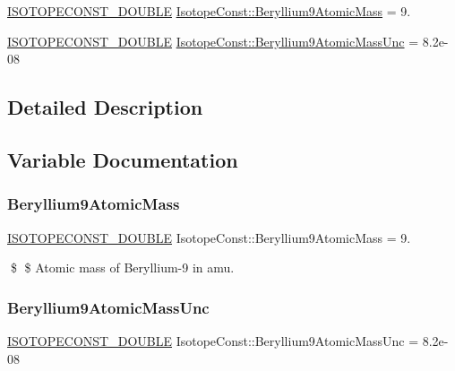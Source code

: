 \begin{DoxyCompactItemize}
\item 
\mbox{\hyperlink{group___isotope_const-_macros_ga8f45a7272ce02c0b4c65c44636ed719a}{I\+S\+O\+T\+O\+P\+E\+C\+O\+N\+S\+T\+\_\+\+D\+O\+U\+B\+LE}} \mbox{\hyperlink{group___isotope_const-_beryllium-_be9_ga7c66a28d4bb240f295546b7600386035}{Isotope\+Const\+::\+Beryllium9\+Atomic\+Mass}} = 9.
\item 
\mbox{\hyperlink{group___isotope_const-_macros_ga8f45a7272ce02c0b4c65c44636ed719a}{I\+S\+O\+T\+O\+P\+E\+C\+O\+N\+S\+T\+\_\+\+D\+O\+U\+B\+LE}} \mbox{\hyperlink{group___isotope_const-_beryllium-_be9_gafcc60c508a38d711325a27ecb5547cb6}{Isotope\+Const\+::\+Beryllium9\+Atomic\+Mass\+Unc}} = 8.\+2e-\/08
\end{DoxyCompactItemize}


\subsection{Detailed Description}


\subsection{Variable Documentation}
\mbox{\label{group___isotope_const-_beryllium-_be9_ga7c66a28d4bb240f295546b7600386035}} 
\subsubsection{\texorpdfstring{Beryllium9\+Atomic\+Mass}{Beryllium9AtomicMass}}
{\footnotesize\ttfamily \mbox{\hyperlink{group___isotope_const-_macros_ga8f45a7272ce02c0b4c65c44636ed719a}{I\+S\+O\+T\+O\+P\+E\+C\+O\+N\+S\+T\+\_\+\+D\+O\+U\+B\+LE}} Isotope\+Const\+::\+Beryllium9\+Atomic\+Mass = 9.}

\$ \$ Atomic mass of Beryllium-\/9 in amu. \mbox{\label{group___isotope_const-_beryllium-_be9_gafcc60c508a38d711325a27ecb5547cb6}} 
\subsubsection{\texorpdfstring{Beryllium9\+Atomic\+Mass\+Unc}{Beryllium9AtomicMassUnc}}
{\footnotesize\ttfamily \mbox{\hyperlink{group___isotope_const-_macros_ga8f45a7272ce02c0b4c65c44636ed719a}{I\+S\+O\+T\+O\+P\+E\+C\+O\+N\+S\+T\+\_\+\+D\+O\+U\+B\+LE}} Isotope\+Const\+::\+Beryllium9\+Atomic\+Mass\+Unc = 8.\+2e-\/08}

